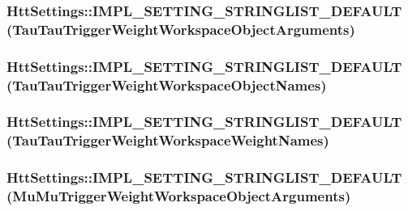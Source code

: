 \label{classHttSettings_a9256889e237953b72db38e53aaf3396d}
\hypertarget{classHttSettings_a321760ee7322f44ea17c8cfc238125ff}{
\subsubsection[{IMPL\_\-SETTING\_\-STRINGLIST\_\-DEFAULT}]{\setlength{\rightskip}{0pt plus 5cm}HttSettings::IMPL\_\-SETTING\_\-STRINGLIST\_\-DEFAULT (TauTauTriggerWeightWorkspaceObjectArguments)}}
\label{classHttSettings_a321760ee7322f44ea17c8cfc238125ff}
\hypertarget{classHttSettings_a804fffc1952f3be2d23de35fca145662}{
\subsubsection[{IMPL\_\-SETTING\_\-STRINGLIST\_\-DEFAULT}]{\setlength{\rightskip}{0pt plus 5cm}HttSettings::IMPL\_\-SETTING\_\-STRINGLIST\_\-DEFAULT (TauTauTriggerWeightWorkspaceObjectNames)}}
\label{classHttSettings_a804fffc1952f3be2d23de35fca145662}
\hypertarget{classHttSettings_a6642e7c88f78f3a77c7fe8f27913cb08}{
\subsubsection[{IMPL\_\-SETTING\_\-STRINGLIST\_\-DEFAULT}]{\setlength{\rightskip}{0pt plus 5cm}HttSettings::IMPL\_\-SETTING\_\-STRINGLIST\_\-DEFAULT (TauTauTriggerWeightWorkspaceWeightNames)}}
\label{classHttSettings_a6642e7c88f78f3a77c7fe8f27913cb08}
\hypertarget{classHttSettings_a4ed979f31a66000c717db31d40241bae}{
\subsubsection[{IMPL\_\-SETTING\_\-STRINGLIST\_\-DEFAULT}]{\setlength{\rightskip}{0pt plus 5cm}HttSettings::IMPL\_\-SETTING\_\-STRINGLIST\_\-DEFAULT (MuMuTriggerWeightWorkspaceObjectArguments)}}
